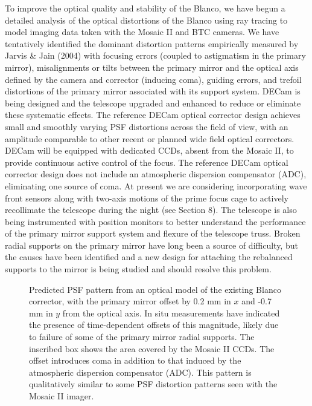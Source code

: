 \documentclass[preprint]{aastex}
\begin{document}
To improve the optical quality and stability of the Blanco, 
we have begun a detailed
analysis of the optical distortions of the Blanco using ray tracing
to model imaging data taken with the Mosaic II and BTC cameras. We
have tentatively identified the dominant distortion patterns
empirically measured by Jarvis \& Jain (2004) with focusing errors
(coupled to astigmatism in the primary mirror), misalignments or
tilts between the primary mirror and the optical axis defined by the
camera and corrector (inducing coma), guiding errors, and trefoil
distortions of the primary mirror associated with its support
system.
DECam is being designed and the telescope upgraded and enhanced to
reduce or eliminate these systematic effects. The reference DECam
optical corrector design achieves small and smoothly varying PSF
distortions across the field of view, with an amplitude comparable
to other recent or planned wide field optical correctors.  DECam
will be equipped with dedicated CCDs, absent from the Mosaic II,
to provide continuous active control of the focus. %
The reference DECam optical corrector design does not
include an atmospheric dispersion compensator (ADC), eliminating one
source of coma. At present we are considering incorporating wave
front sensors along with two-axis motions of the prime focus cage to
actively recollimate the telescope during the night (see Section 8).
The telescope is also being instrumented with position monitors to
better understand the performance of the primary mirror support
system and flexure of the telescope truss.  Broken radial supports
on the primary mirror have long been a source of difficulty, but the
causes have been identified and a new design for attaching the
rebalanced supports to the mirror is being studied and should
resolve this problem.

\begin{figure}[h]
\centerline{}
  \caption{
Predicted PSF pattern from an optical model of the existing
Blanco corrector, with the primary mirror offset by 0.2 mm in $x$ and
-0.7 mm in $y$ from the optical axis. In situ measurements have
indicated the presence of time-dependent offsets of this magnitude,
likely due to failure of some of the primary mirror radial supports.
The inscribed box shows the area covered by the Mosaic II CCDs. The
offset introduces coma in addition to that induced by the
atmospheric dispersion compensator (ADC). This pattern is
qualitatively similar to some PSF distortion patterns seen with the
Mosaic II imager.
  }
  \label{fig:model_seeing}
\end{figure}
\end{document}
